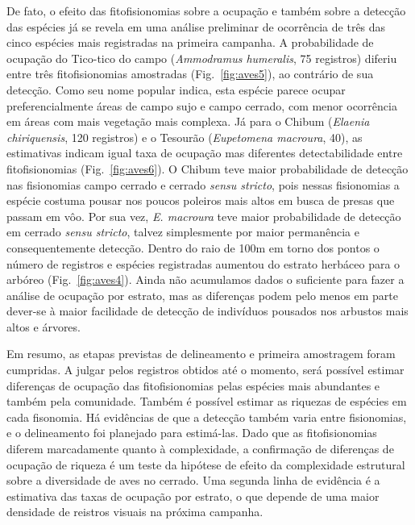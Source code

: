 De fato, o efeito das fitofisionomias sobre a ocupação e também sobre
a detecção das espécies já se revela em uma análise preliminar
de ocorrência de três das cinco espécies mais registradas na
primeira campanha. A probabilidade de ocupação do  Tico-tico 
do campo  (\textit{Ammodramus humeralis}, 75 registros) 
diferiu entre três fitofisionomias amostradas
(Fig.~\ref{fig:aves5}), ao contrário de sua detecção. 
Como seu nome popular indica, esta espécie parece ocupar
preferencialmente áreas de campo sujo e campo cerrado, com menor
ocorrência em áreas com mais vegetação mais complexa. Já para o Chibum
(\textit{Elaenia chiriquensis}, 120 registros) e o Tesourão (\textit{Eupetomena
macroura}, 40), as estimativas indicam igual taxa de ocupação mas diferentes 
detectabilidade entre fitofisionomias 
(Fig.~\ref{fig:aves6}). O Chibum teve maior
probabilidade de detecção nas fisionomias campo cerrado e cerrado
\textit{sensu stricto}, pois nessas fisionomias a espécie costuma pousar nos poucos 
poleiros mais altos em busca de presas que passam em vôo. Por sua vez,
\textit{E. macroura} teve maior probabilidade de detecção em cerrado
\textit{sensu stricto}, talvez simplesmente por
maior permanência e consequentemente detecção.
Dentro do raio de 100m em torno dos pontos o número de registros e 
espécies registradas  aumentou
do estrato herbáceo para o arbóreo (Fig.~\ref{fig:aves4}).  
Ainda não acumulamos 
dados o suficiente para fazer a análise de ocupação
por estrato, mas as diferenças podem pelo menos em parte dever-se 
à maior facilidade de detecção de indivíduos pousados
nos arbustos mais altos e árvores. 

Em resumo, as etapas previstas de delineamento e primeira amostragem
foram cumpridas. A julgar pelos registros obtidos até o momento,
será possível estimar diferenças de ocupação das fitofisionomias
pelas espécies mais abundantes e também pela comunidade.
Também é possível estimar as riquezas de espécies em cada fisonomia.
Há evidências de que a detecção também varia entre fisionomias,
e o delineamento foi planejado para estimá-las.
Dado que as fitofisionomias diferem marcadamente quanto à complexidade,
a confirmação de diferenças de ocupação de riqueza é um teste
da hipótese de efeito da complexidade estrutural sobre a diversidade
de aves no cerrado. Uma segunda linha de evidência é a estimativa das
taxas de ocupação por estrato, o que depende de uma maior densidade de 
reistros visuais na próxima campanha.